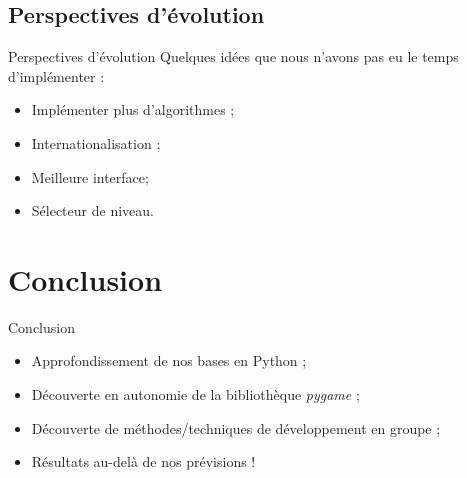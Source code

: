 \documentclass[xcolor=dvipsnames]{beamer}
\begin{document}
\subsection{Perspectives d'évolution}
	\begin{frame}{Perspectives d'évolution}
		Quelques idées que nous n'avons pas eu le temps d'implémenter :
		\begin{itemize}
		\setlength{\itemsep}{0.3cm}
			\item Implémenter plus d'algorithmes ;
			\item Internationalisation ;
			\item Meilleure interface;
            \item Sélecteur de niveau.
		\end{itemize}
	\end{frame}

\section{Conclusion}
	\begin{frame}{Conclusion}
		\begin{itemize}
		\setlength{\itemsep}{0.4cm}
			\item Approfondissement de nos bases en Python ;
			\item Découverte en autonomie de la bibliothèque \emph{pygame} ;
			\item Découverte de méthodes/techniques de développement en groupe ;
			\item Résultats au-delà de nos prévisions !
		\end{itemize}
	\end{frame}
\end{document}
